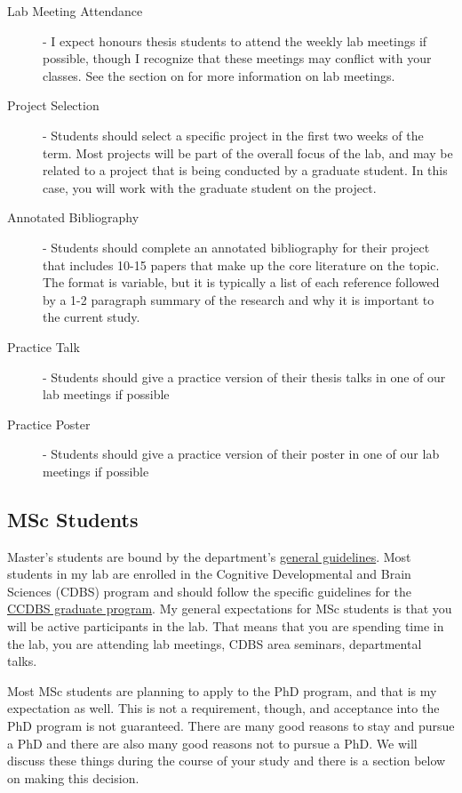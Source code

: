 \documentclass{article}
\begin{document}
\begin{description}
\item [Lab Meeting Attendance] - I expect honours thesis students to attend the weekly lab meetings if possible, though I recognize that these meetings may conflict with your classes. See the section on  for more information on lab meetings.

\item [Project Selection] - Students should select a specific project in the first two weeks of the term. Most projects will be part of the overall focus of the lab, and may be related to a project that is being conducted by a graduate student. In this case, you will work with the graduate student on the project. 

\item [Annotated Bibliography] - Students should complete an annotated bibliography for their project that includes 10-15 papers that make up the core literature on the topic. The format is variable, but it is typically a list of each reference followed by a 1-2 paragraph summary of the research and why it is important to the current study. 

\item [Practice Talk] - Students should give a practice version of their thesis talks in one of our lab meetings if possible

\item [Practice Poster] - Students should give a practice version of their poster in one of our lab meetings if possible
\end{description}

\subsection {MSc Students}
Master's students are bound by the department's \href{http://psychology.uwo.ca/graduate/index.html}{general guidelines}. Most students in my lab are enrolled in the Cognitive Developmental and Brain Sciences (CDBS) program and should follow the specific guidelines for the \href{http://psychology.uwo.ca/graduate/program_information/cdbs_program_requirements.html}{CCDBS graduate program}. My general expectations for MSc students is that you will be active participants in the lab. That means that you are spending time in the lab, you are attending lab meetings, CDBS area seminars, departmental talks. 

Most MSc students are planning to apply to the PhD program, and that is my expectation as well. This is not a requirement, though, and acceptance into the PhD program is not guaranteed. There are many good reasons to stay and pursue a PhD and there are also many good reasons not to pursue a PhD. We will discuss these things during the course of your study and there is a section below on making this decision.
\end{document}
